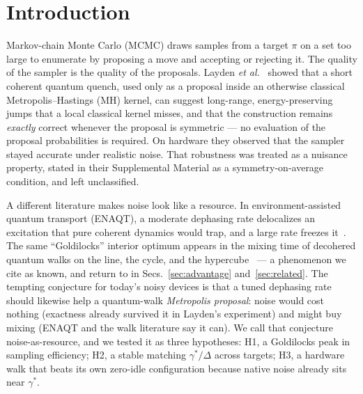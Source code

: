 \documentclass[aps,prx,reprint,floatfix,amsmath,amssymb,amsfonts]{revtex4-2}
\begin{document}
\begin{abstract}
measured certification cost of at least one order of magnitude every
four spins, because an exact shell proposal must certify a near-empty
energy window complete --- a proof a physical sampler never performs.
That asymmetry generalizes: a conserved diagonal charge confines every
measured outcome to its symmetry sector while preserving evaluation-free
exactness within it, a feasibility certificate priced at zero; but a
pre-registered race of the amortized architecture this suggests ---
device-mined proposal libraries consumed by exact mode-jumping ---
is killed by its own criteria, classically. Noise costs nothing and buys nothing; the
quench's edge is global isoenergetic proposals.
\end{abstract}

\maketitle

\section{Introduction}

Markov-chain Monte Carlo (MCMC) draws samples from a target $\pi$ on a
set too large to enumerate by proposing a move and accepting or
rejecting it. The quality of the sampler is the quality of the
proposals. Layden \emph{et al.}~\cite{Layden2023} showed that a short
coherent quantum quench, used only as a proposal inside an otherwise
classical Metropolis--Hastings (MH) kernel, can suggest long-range,
energy-preserving jumps that a local classical kernel misses, and that
the construction remains \emph{exactly} correct whenever the proposal is
symmetric --- no evaluation of the proposal probabilities is required.
On hardware they observed that the sampler stayed accurate under
realistic noise. That robustness was treated as a nuisance property,
stated in their Supplemental Material as a symmetry-on-average
condition, and left unclassified.

A different literature makes noise look like a resource. In
environment-assisted quantum transport (ENAQT), a moderate dephasing
rate delocalizes an excitation that pure coherent dynamics would trap,
and a large rate freezes it~\cite{Rebentrost2009,LloydMohseni2011}. The
same ``Goldilocks'' interior optimum appears in the mixing time of
decohered quantum walks on the line, the cycle, and the
hypercube~\cite{KendonTregenna2003,Fedichkin2006,AlagicRussell2005,Drezgich2009}
--- a phenomenon we cite as known, and return to in Secs.~\ref{sec:advantage}
and~\ref{sec:related}. The tempting conjecture for today's noisy devices
is that a tuned dephasing rate should likewise help a quantum-walk
\emph{Metropolis proposal}: noise would cost nothing (exactness already
survived it in Layden's experiment) and might buy mixing (ENAQT and the
walk literature say it can). We call that conjecture noise-as-resource,
and we tested it as three hypotheses: H1, a Goldilocks peak in sampling
efficiency; H2, a stable matching $\gamma^\ast/\Delta$ across targets;
H3, a hardware walk that beats its own zero-idle configuration because
native noise already sits near $\gamma^\ast$.
\end{document}
